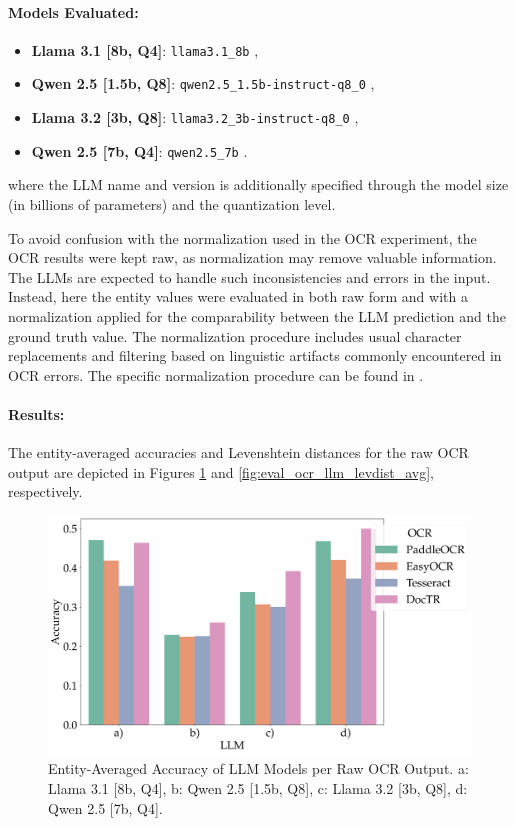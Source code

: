 \documentclass[11pt]{article}
\begin{document}
\paragraph{Models Evaluated:}
\begin{itemize}
    \item \textbf{Llama 3.1 [8b, Q4]}: \texttt{llama3.1\_8b} \cite{touvron2023},
    \item \textbf{Qwen 2.5 [1.5b, Q8]}: \texttt{qwen2.5\_1.5b-instruct-q8\_0} \cite{qwen2025},
    \item \textbf{Llama 3.2 [3b, Q8]}: \texttt{llama3.2\_3b-instruct-q8\_0} \cite{touvron2023},
    \item \textbf{Qwen 2.5 [7b, Q4]}: \texttt{qwen2.5\_7b} \cite{qwen2025}.
\end{itemize}
where the LLM name and version is additionally specified through the model size (in billions of parameters) and the quantization level.

To avoid confusion with the normalization used in the OCR experiment, the OCR results were kept raw, as normalization may remove valuable information. The LLMs are expected to handle such inconsistencies and errors in the input. Instead, here the entity values were evaluated in both raw form and with a normalization applied for the comparability between the LLM prediction and the ground truth value. The normalization procedure includes usual character replacements and filtering based on linguistic artifacts commonly encountered in OCR errors. The specific normalization procedure can be found in .
\paragraph{Results:}
The entity-averaged accuracies and Levenshtein distances for the raw OCR output are depicted in Figures \ref{fig:eval_ocr_llm_accuracies_avg} and \ref{fig:eval_ocr_llm_levdist_avg}, respectively.

\begin{figure}[h!]
    \centering
    \includegraphics[width=0.8\linewidth]{figures/avg_accuracies.png}
    \caption{Entity-Averaged Accuracy of LLM Models per Raw OCR Output. a: Llama 3.1 [8b, Q4], b: Qwen 2.5 [1.5b, Q8], c: Llama 3.2 [3b, Q8], d: Qwen 2.5 [7b, Q4].}
    \label{fig:eval_ocr_llm_accuracies_avg}
\end{figure}
\end{document}
